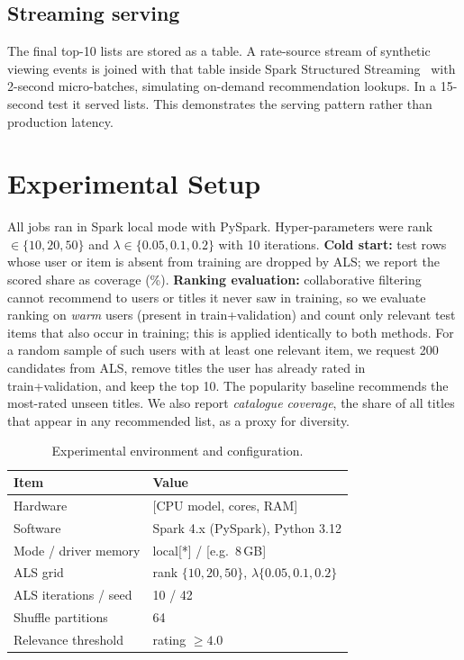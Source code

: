 \documentclass[conference]{IEEEtran}
\begin{document}
\subsection{Streaming serving}
The final top-10 lists are stored as a table. A rate-source stream of synthetic viewing events is joined with that table inside Spark Structured Streaming~\cite{structured} with 2-second micro-batches, simulating on-demand recommendation lookups. In a 15-second test it served \streamRows{} lists. This demonstrates the serving pattern rather than production latency.

\section{Experimental Setup}\label{sec:eval}
All jobs ran in Spark local mode with PySpark. Hyper-parameters were rank $\in\{10,20,50\}$ and $\lambda\in\{0.05,0.1,0.2\}$ with 10 iterations. \textbf{Cold start:} test rows whose user or item is absent from training are dropped by ALS; we report the scored share as coverage (\alsCoverage\%). \textbf{Ranking evaluation:} collaborative filtering cannot recommend to users or titles it never saw in training, so we evaluate ranking on \emph{warm} users (present in train+validation) and count only relevant test items that also occur in training; this is applied identically to both methods. For a random sample of \evalUsers{} such users with at least one relevant item, we request 200 candidates from ALS, remove titles the user has already rated in train+validation, and keep the top 10. The popularity baseline recommends the most-rated unseen titles. We also report \emph{catalogue coverage}, the share of all titles that appear in any recommended list, as a proxy for diversity.

\begin{table}[t]
\caption{Experimental environment and configuration.}
\label{tab:env}
\centering
\small
\begin{tabular}{ll}
\toprule
Item & Value \\
\midrule
Hardware & [CPU model, cores, RAM] \\
Software & Spark 4.x (PySpark), Python 3.12 \\
Mode / driver memory & local[*] / [e.g.\ 8\,GB] \\
ALS grid & rank $\{10,20,50\}$, $\lambda\{0.05,0.1,0.2\}$ \\
ALS iterations / seed & 10 / 42 \\
Shuffle partitions & 64 \\
Relevance threshold & rating $\ge 4.0$ \\
\bottomrule
\end{tabular}
\end{table}
\end{document}
